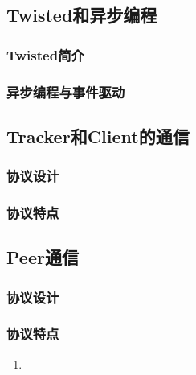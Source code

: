 \documentclass[15pt]{ctexart}
\begin{document}
	\subsection{Twisted和异步编程} %
	\label{sub:twisted和异步编程}
		\subsubsection{Twisted简介} %
		\label{ssub:twisted简介}
		
		\subsubsection{异步编程与事件驱动} %
		\label{ssub:异步编程与事件驱动}
		

	\subsection{Tracker和Client的通信} %
	\label{sub:tracker_和_client}

		\subsubsection{协议设计} %
		\label{ssub:协议设计}
		
		\subsubsection{协议特点} %
		\label{ssub:协议特点}
		
	\subsection{Peer通信} %
	\label{sub:peer通信}

		\subsubsection{协议设计} %
		\label{ssub:协议设计}
			
		\subsubsection{协议特点} %
		\label{ssub:协议特点}
			\begin{enumerate}
				\item 
			\end{enumerate}
	
\end{document}
